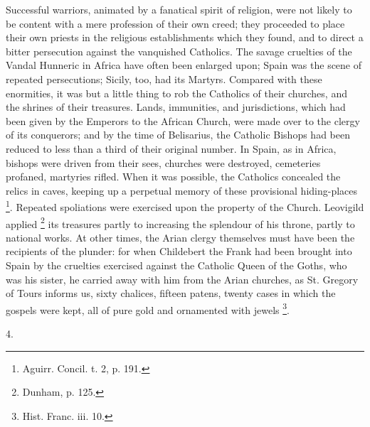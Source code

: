 Successful warriors, animated by a fanatical spirit of religion,
were not likely to be content with a mere profession of their own
creed; they proceeded to place their own priests in the religious
establishments which they found, and to direct a bitter persecution
against the vanquished Catholics. The savage cruelties of the Vandal
Hunneric in Africa have often been enlarged upon; Spain was the scene
of repeated persecutions; Sicily, too, had its Martyrs. Compared with
these enormities, it was but a little thing to rob the Catholics of
their churches, and the shrines of their treasures. Lands, immunities,
and jurisdictions, which had been given by the Emperors to the African
Church, were made over to the clergy of its conquerors; and by the
time of Belisarius, the Catholic Bishops had been reduced to less than
a third of their original number. In Spain, as in Africa, bishops were
driven from their sees, churches were destroyed, cemeteries profaned,
martyries rifled. When it was possible, the Catholics concealed the
relics in caves, keeping up a perpetual memory of these provisional
hiding-places \footnote{Aguirr. Concil. t. 2, p. 191.}. Repeated
spoliations were exercised upon the property of the Church. Leovigild
applied \footnote{Dunham, p. 125.} its treasures
partly to increasing the splendour of his throne, partly to national
works. At other times, the Arian clergy themselves must have been the
recipients of the plunder: for when Childebert the Frank had been
brought into Spain by the cruelties exercised against the Catholic
Queen of the Goths, who was his sister, he carried away with him from
the Arian churches, as St. Gregory of Tours informs us, sixty
chalices, fifteen patens, twenty cases in which the gospels were kept,
all of pure gold and ornamented with jewels \footnote{Hist. Franc. iii. 10.}.

4.

